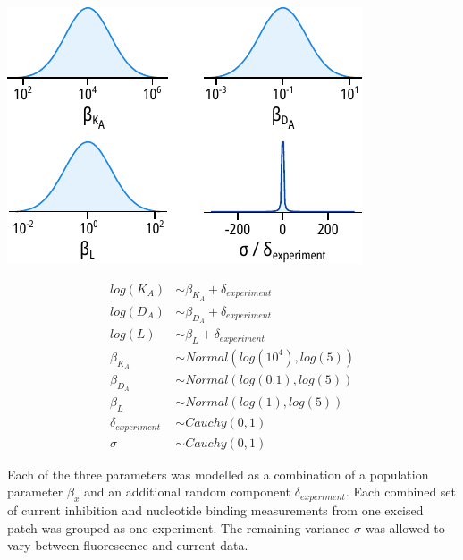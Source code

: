 \begin{minipage}{.5\textwidth}
\centering
\includegraphics[width=\textwidth]{mwc_priors.pdf}
\end{minipage}
\begin{minipage}{.5\textwidth}
\centering
\begin{equation} \label{eq:mwc_priors}
\begin{split}
log(K_A) &\sim \beta_{K_A} + \delta_{experiment} \\
log(D_A) &\sim \beta_{D_A} + \delta_{experiment} \\
log(L) &\sim \beta_{L} + \delta_{experiment} \\
\beta_{K_A} &\sim Normal(log(10^4), log(5)) \\
\beta_{D_A} &\sim Normal(log(0.1), log(5)) \\
\beta_{L} &\sim Normal(log(1), log(5)) \\
\delta_{experiment} &\sim Cauchy(0, 1) \\
\sigma &\sim Cauchy(0, 1)
\end{split}
\end{equation}
\end{minipage}

Each of the three parameters was modelled as a combination of a population parameter $\beta_x$ and an additional random component $\delta_{experiment}$.
Each combined set of current inhibition and nucleotide binding measurements from one excised patch was grouped as one experiment.
The remaining variance $\sigma$ was allowed to vary between fluorescence and current data.

